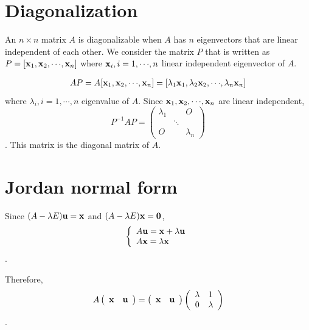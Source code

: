 \documentclass[dvipdfmx]{article}
\begin{document}
\section*{Diagonalization}
An $n{\times}n$ matrix $A$ is diagonalizable when $A$ has $n$ eigenvectors that are linear independent of each other.
We consider the matrix $P$ that is written as $P=[{\bf{x}}_1, {\bf{x}}_2, {\cdots}, {\bf{x}}_n]$ where ${\bf{x}}_i, i=1,{\cdots},n$ linear independent eigenvector of $A$.

\begin{eqnarray}
AP = A[{\bf{x}}_1, {\bf{x}}_2, {\cdots}, {\bf{x}}_n]
     = [{\lambda}_1{\bf{x}}_1, {\lambda}_2{\bf{x}}_2, {\cdots}, {\lambda}_n{\bf{x}}_n] \nonumber
\end{eqnarray}
where ${\lambda}_i, i=1,{\cdots},n$ eigenvalue of $A$.
Since ${\bf{x}}_1, {\bf{x}}_2, {\cdots}, {\bf{x}}_n$ are linear independent,
\[
  P^{-1}AP =
  \left(
  \begin{array}{ccc}
  {\lambda}_{1} & \ & O \\
  \          & \ddots  & \    \\
  O        &   \          & {\lambda}_{n}
  \end{array}
  \right)
\] .
This matrix is the diagonal matrix of $A$.
 
 
\section*{Jordan normal form}
Since $(A - {\lambda}E){\bf{u}} = {\bf{x}}$ and $(A - {\lambda}E){\bf{x}} = {\bf{0}}$,
\begin{eqnarray}
\left\{ \begin{array}{ll}
A{\bf{u}}= {\bf{x}} + {\lambda}{\bf{u}} \\
A{\bf{x}}={\lambda}{\bf{x}} \\
\end{array} \right.
\end{eqnarray} .

Therefore,
 \[
   A
   \left(
   \begin{array}{cc}
   {\bf{x}} & {\bf{u}} 
   \end{array}
   \right)
   =
   \left(
   \begin{array}{cc}
   {\bf{x}} & {\bf{u}} 
   \end{array}
   \right)
   \left(
   \begin{array}{cc}
   {\lambda} & 1 \\
   0 & {\lambda}
   \end{array}
   \right)
  \] .
\end{document}
